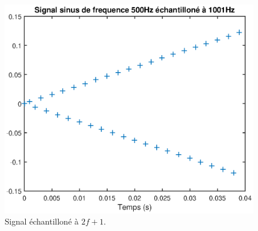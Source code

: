 \documentclass[french]{article}
\begin{document}
\begin{figure}[h!]
	\centering
	\begin{minipage}{0.45\textwidth}
	\centering
	\includegraphics[width=\textwidth]{images/echantillone_1.eps}
	\caption{Signal échantilloné à $2f+1$.}
	\label{fig:echantillon1}


\end{minipage}
\end{figure}
\end{document}
